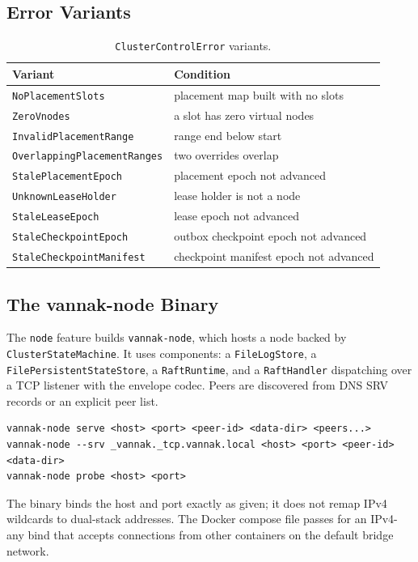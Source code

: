 \subsection{Error Variants}

\begin{table}[htbp]
\centering
\begin{tabular}{ll}
\hline
Variant & Condition \\
\hline
\texttt{NoPlacementSlots} & placement map built with no slots \\
\texttt{ZeroVnodes} & a slot has zero virtual nodes \\
\texttt{InvalidPlacementRange} & range end below start \\
\texttt{OverlappingPlacementRanges} & two overrides overlap \\
\texttt{StalePlacementEpoch} & placement epoch not advanced \\
\texttt{UnknownLeaseHolder} & lease holder is not a node \\
\texttt{StaleLeaseEpoch} & lease epoch not advanced \\
\texttt{StaleCheckpointEpoch} & outbox checkpoint epoch not advanced \\
\texttt{StaleCheckpointManifest} & checkpoint manifest epoch not advanced \\
\hline
\end{tabular}
\caption{\texttt{ClusterControlError} variants.}
\end{table}

\subsection{The vannak-node Binary}

The \texttt{node} feature builds \texttt{vannak-node}, which hosts a \raft{}
node backed by \texttt{ClusterStateMachine}. It uses \graft{} components: a
\texttt{FileLogStore}, a \texttt{FilePersistentStateStore}, a
\texttt{RaftRuntime}, and a \texttt{RaftHandler} dispatching over a TCP listener
with the \graft{} envelope codec. Peers are discovered from DNS SRV records or
an explicit peer list.

\begin{lstlisting}[numbers=none]
vannak-node serve <host> <port> <peer-id> <data-dir> <peers...>
vannak-node --srv _vannak._tcp.vannak.local <host> <port> <peer-id> <data-dir>
vannak-node probe <host> <port>
\end{lstlisting}

\begin{vnote}
The binary binds the host and port exactly as given; it does not remap IPv4
wildcards to dual-stack addresses. The Docker compose file passes
 for an IPv4-any bind that accepts connections from
other containers on the default bridge network.
\end{vnote}

